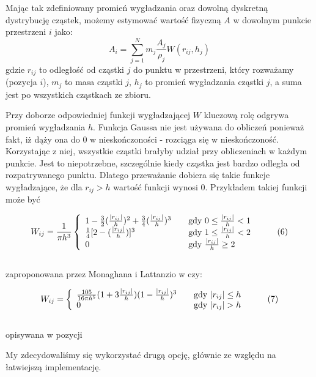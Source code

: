 \documentclass[polish, 12pt]{aghthesis}
\begin{document}
			Mając tak zdefiniowany promień wygładzania oraz dowolną dyskretną dystrybucję cząstek, możemy estymować wartość fizyczną $A$ w dowolnym punkcie przestrzeni $i$ jako: \[{A}_i=\sum_{j=1}^{N}m_j\frac{A_j}{\rho_j}W(r_{ij},h_j) \label{eq:calc_all} \tag{5}\] gdzie ${r_{ij}}$ to odległość od cząstki $j$ do punktu w przestrzeni, który rozważamy (pozycja $i$), ${m_j}$ to masa cząstki $j$, ${h_j}$ to promień wygładzania cząstki $j$, a suma jest po wszystkich cząstkach ze zbioru. 
			
			
			Przy doborze odpowiedniej funkcji wygładzającej $W$ kluczową rolę odgrywa promień wygładzania $h$. Funkcja Gaussa nie jest używana do obliczeń ponieważ fakt, iż dąży ona do 0 w nieskończoności - rozciąga się w nieskończoność. Korzystając z niej, wszystkie cząstki brałyby udział przy obliczeniach w każdym punkcie. Jest to niepotrzebne, szczególnie kiedy cząstka jest bardzo odległa od rozpatrywanego punktu. Dlatego przeważanie dobiera się takie funkcje wygładzające, że dla ${r_{ij} > h}$ wartość funkcji wynosi 0. Przykładem takiej funkcji może być
			
			\[ W_{ij} = \frac{1}{\pi h^3} \left\{ 
				\begin{array}{l l l}
					1 - \frac{3}{2}(\frac{|r_{ij}|}{h})^2 + \frac{3}{4}(\frac{|r_{ij}|}{h})^3  & \quad \text{gdy ${0 \leq \frac{|r_{ij}|}{h} < 1}$}  \\ 
					\frac{1}{4}[2 - (\frac{|r_{ij}|}{h})]^3  & \quad \text{gdy ${1 \leq \frac{|r_{ij}|}{h} < 2}$}  \\ 
					0 & \quad \text{gdy ${\frac{|r_{ij}|}{h} \geq 2 }$} 
				\end{array} \right.\ \label{eq:kernel_function} \tag{6}\]
			\ \\
			zaproponowana przez Monaghana i Lattanzio w \cite{MonLat} czy:
			
			\[ W_{ij} = \left\{
				\begin{array}{l l}
					\frac{105}{16 \pi h^5}(1 + 3 \frac{|r_{ij}|}{h})(1-\frac{|r_{ij}|}{h})^3 & \quad \text{gdy ${|r_{ij}| \leq h}$}  \\ 0 & \quad \text{gdy ${|r_{ij}| > h}$} 
				\end{array} \right.\ \label{eq:kernel_function} \tag{7}\]
			\ \\
			opisywana w pozycji \cite{Lucy}
			
			My zdecydowaliśmy się wykorzystać drugą opcję, głównie ze względu na łatwiejszą implementację. 
			
\end{document}
